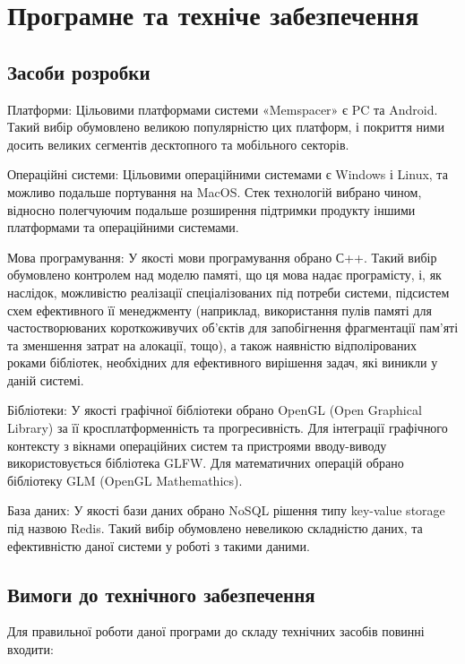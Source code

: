 \section{Програмне та техніче забезпечення}
\subsection{Засоби розробки}

Платформи:
Цільовими платформами системи «Memspacer» є PC та Android. Такий вибір обумовлено великою популярністю цих платформ, і покриття ними досить великих сегментів десктопного та мобільного секторів.

Операційні системи:
Цільовими операційними системами є Windows і Linux, та можливо подальше портування на MacOS.
Стек технологій вибрано чином, відносно полегчуючим подальше розширення підтримки продукту іншими платформами та операційними системами.

Мова програмування:
У якості мови програмування обрано С++. Такий вибір обумовлено контролем над моделю памяті, що ця мова надає програмісту, і, як наслідок, можливістю реалізації спеціалізованих під потреби системи, підсистем схем ефективного її менеджменту (наприклад, використання пулів памяті для частостворюваних короткоживучих об'єктів для запобігнення фрагментації пам'яті та зменшення затрат на алокації, тощо), а також наявністю відполірованих роками бібліотек, необхідних для ефективного вирішення задач, які виникли у даній системі.

Бібліотеки:
У якості графічної бібліотеки обрано OpenGL (Open Graphical Library) за її кросплатформенність та прогресивність.
Для інтеграції графічного контексту з вікнами операційних систем та пристроями вводу-виводу використовується бібліотека GLFW.
Для математичних операцій обрано бібліотеку GLM (OpenGL Mathemathics).

База даних:
У якості бази даних обрано NoSQL рішення типу key-value storage під назвою Redis. Такий вибір обумовлено невеликою складністю даних, та ефективністю даної системи у роботі з такими даними.

\subsection{Вимоги до технічного забезпечення}

Для правильної роботи даної програми до складу технічних засобів повинні входити:

